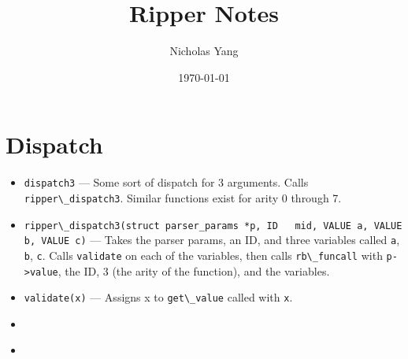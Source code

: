 \documentclass[11pt]{article}
\author{Nicholas Yang}
\date{\today}
\title{Ripper Notes}
\begin{document}
\maketitle
\tableofcontents


\section{Dispatch}
\label{sec-1}

\begin{itemize}
\item \label{dispatch3} \verb~dispatch3~ --- Some sort of dispatch for 3
arguments. Calls \texttt{\verb~ripper\_dispatch3~}. Similar functions exist for
arity 0 through 7.

\item \label{ripper_dispatch3} \verb~ripper\_dispatch3(struct parser_params *p, ID   mid, VALUE a, VALUE b, VALUE c)~ --- Takes the parser params, an ID,
and three variables called \verb~a~, \verb~b~, \verb~c~. Calls \texttt{\verb~validate~} on each
of the variables, then calls \texttt{\verb~rb\_funcall~} with \verb~p->value~, the ID, 3
(the arity of the function), and the variables.

\item \label{validate} \verb~validate(x)~ --- Assigns x to
\texttt{\verb~get\_value~} called with \verb~x~.

\item \label{get_value}

\item \label{rb_funcall}
\end{itemize}
\end{document}
